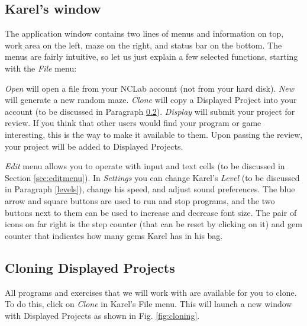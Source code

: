 \documentclass[article,A4,12pt]{llncs}
\begin{document}
\subsection{Karel's window} \label{menu}

The application window contains two lines of menus and information on top,
work area on the left, maze on the right, and status bar on the bottom.
The menus are fairly intuitive, so let us just explain a few selected functions, starting 
with the {\em File} menu:

{\em Open} will open a file from your NCLab account (not from your hard disk). {\em New} will generate a new random maze.
{\em Clone} will copy a Displayed Project into your account (to be discussed in Paragraph \ref{cloning}). 
{\em Display} will submit your project for review. If you think that 
      other users would find your program or game interesting, this is the way to make it 
      available to them. Upon passing the review, your project will be added to Displayed Projects.

{\em Edit} menu allows you to operate with input and text cells (to be discussed in 
Section \ref{sec:editmenu}). In {\em Settings} you can change Karel's {\em Level} (to be discussed
in Paragraph \ref{levels}), change his speed, and adjust sound preferences. The blue arrow and square 
buttons are used to run and stop programs, and the two buttons next to them can be used to increase and decrease 
font size. The pair of icons on far right is the step counter (that can be reset by clicking on it) and 
gem counter that indicates how many gems Karel has in his bag.

\subsection{Cloning Displayed Projects} \label{cloning}

All programs and exercises that we will work with are available for you to clone. 
To do this, click on {\em Clone} in Karel's File menu. This will launch a new window 
with Displayed Projects as shown in Fig. \ref{fig:cloning}.
\end{document}
